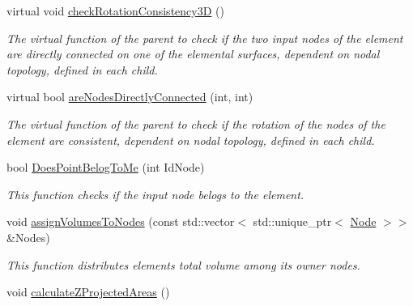 \begin{DoxyCompactItemize}
\item 
\hypertarget{classShapeBase_a4e33b4fea2d126f59ca0bcf73e07a253}{}virtual void \hyperlink{classShapeBase_a4e33b4fea2d126f59ca0bcf73e07a253}{check\+Rotation\+Consistency3\+D} ()\label{classShapeBase_a4e33b4fea2d126f59ca0bcf73e07a253}

\begin{DoxyCompactList}\small\item\em The virtual function of the parent to check if the two input nodes of the element are directly connected on one of the elemental surfaces, dependent on nodal topology, defined in each child. \end{DoxyCompactList}\item 
\hypertarget{classShapeBase_aae5ef32d56aa383108f2d6912469138f}{}virtual bool \hyperlink{classShapeBase_aae5ef32d56aa383108f2d6912469138f}{are\+Nodes\+Directly\+Connected} (int, int)\label{classShapeBase_aae5ef32d56aa383108f2d6912469138f}

\begin{DoxyCompactList}\small\item\em The virtual function of the parent to check if the rotation of the nodes of the element are consistent, dependent on nodal topology, defined in each child. \end{DoxyCompactList}\item 
\hypertarget{classShapeBase_aed4c893952a6afad718a2037e0635296}{}bool \hyperlink{classShapeBase_aed4c893952a6afad718a2037e0635296}{Does\+Point\+Belog\+To\+Me} (int Id\+Node)\label{classShapeBase_aed4c893952a6afad718a2037e0635296}

\begin{DoxyCompactList}\small\item\em This function checks if the input node belogs to the element. \end{DoxyCompactList}\item 
\hypertarget{classShapeBase_a4348dcb67c58e31020346cdc0a5e7cc7}{}void \hyperlink{classShapeBase_a4348dcb67c58e31020346cdc0a5e7cc7}{assign\+Volumes\+To\+Nodes} (const std\+::vector$<$ std\+::unique\+\_\+ptr$<$ \hyperlink{classNode}{Node} $>$$>$ \&Nodes)\label{classShapeBase_a4348dcb67c58e31020346cdc0a5e7cc7}

\begin{DoxyCompactList}\small\item\em This function distributes element\textquotesingle{}s total volume among its owner nodes. \end{DoxyCompactList}\item 
\hypertarget{classShapeBase_a4bc9c0bb828f73c105321fd5a25be8cc}{}void \hyperlink{classShapeBase_a4bc9c0bb828f73c105321fd5a25be8cc}{calculate\+Z\+Projected\+Areas} ()\label{classShapeBase_a4bc9c0bb828f73c105321fd5a25be8cc}


\end{DoxyCompactItemize}
